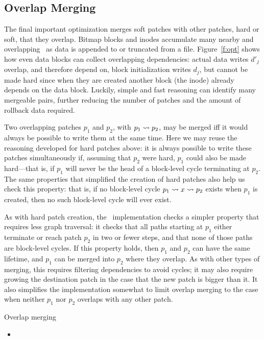 \subsection{Overlap Merging}
\label{sec:chdescs:merge:overlap}

The final important optimization merges soft patches with other patches,
hard or soft, that they overlap.
%
Bitmap blocks and inodes accumulate many nearby and overlapping \chdescs\
as data is appended to or truncated from a file.
%
Figure~\ref{f:opt} shows how even data blocks can collect overlapping
dependencies: actual data writes $d'_j$ overlap, and therefore depend on,
block initialization writes $d_j$, but cannot be made hard since when they
are created another block (the inode) already depends on the data block.
%
Luckily, simple and fast reasoning can identify many mergeable pairs,
further reducing the number of patches and the amount of rollback data
required.


Two overlapping patches $p_1$ and $p_2$, with $p_1 \leadsto p_2$, may be
merged iff it would always be possible to write them at the same time.
%
Here we may reuse the reasoning developed for hard patches above: it is
always possible to write these patches simultaneously if, assuming that
$p_2$ were hard, $p_1$ could also be made hard---that is, if $p_1$ will
never be the head of a block-level cycle terminating at $p_2$.
%
The same properties that simplified the creation of hard patches also help
us check this property: that is, if no block-level cycle $p_1 \leadsto x
\leadsto p_2$ exists when $p_1$ is created, then no such block-level cycle
will ever exist.



As with hard patch creation, the \Kudos\ implementation checks a simpler
property that requires less graph traversal:
%
it checks that all paths starting at $p_1$ either terminate or reach patch
$p_2$ in two or fewer steps, and that none of those paths are block-level
cycles.
%
If this property holds, then $p_1$ and $p_2$ can have the same lifetime,
and $p_1$ can be merged into $p_2$ where they overlap.
%
As with other types of merging, this requires filtering dependencies to
avoid cycles; it may also require growing the destination patch in the case
that the new patch is bigger than it.
%
It also simplifies the implementation somewhat to limit overlap merging to
the case when neither $p_1$ nor $p_2$ overlaps with any other patch.


Overlap merging 


\begin{itemize}
\item
\end{itemize}


